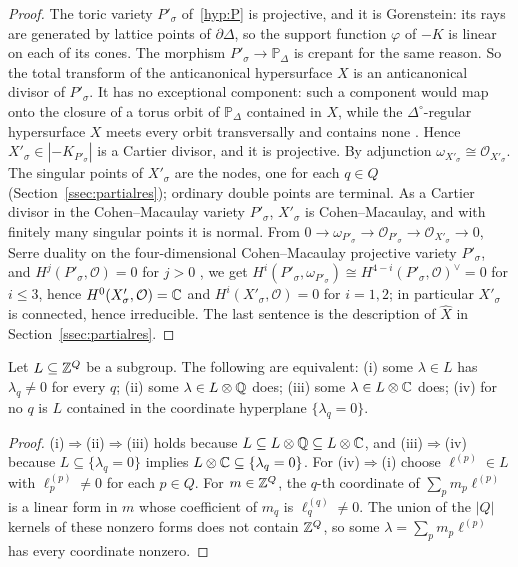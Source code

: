 \begin{proof}
The toric variety $P'_\sigma$ of~\ref{hyp:P} is projective, and it is Gorenstein: its rays are generated by lattice points
of $\partial\Delta$, so the support function $\varphi$ of $-K$ is linear on each of its cones. The morphism
$P'_\sigma\to\mathbb P_\Delta$ is crepant for the same reason. So the total transform of the anticanonical hypersurface $X$
is an anticanonical divisor of $P'_\sigma$. It has no exceptional component: such a component would map onto the closure
of a torus orbit of $\mathbb P_\Delta$ contained in $X$, while the $\Delta^\circ$-regular hypersurface $X$ meets every orbit
transversally and contains none \cite[\S3]{Batyrev}. Hence $X'_\sigma\in|-K_{P'_\sigma}|$ is a Cartier divisor, and it is
projective. By adjunction $\omega_{X'_\sigma}\cong\mathcal O_{X'_\sigma}$. The singular points of $X'_\sigma$ are the nodes,
one for each $q\in Q$ (Section~\ref{ssec:partialres}); ordinary double points are terminal. As a Cartier divisor in the
Cohen--Macaulay variety $P'_\sigma$, $X'_\sigma$ is Cohen--Macaulay, and with finitely many singular points it is normal.
From $0\to\omega_{P'_\sigma}\to\mathcal O_{P'_\sigma}\to\mathcal O_{X'_\sigma}\to0$, Serre duality on the four-dimensional
Cohen--Macaulay projective variety $P'_\sigma$, and $H^j(P'_\sigma,\mathcal O)=0$ for $j>0$ \cite[\S9.2]{CLS}, we get
$H^i(P'_\sigma,\omega_{P'_\sigma})\cong H^{4-i}(P'_\sigma,\mathcal O)^\vee=0$ for $i\le3$, hence
$H^0(X'_\sigma,\mathcal O)=\mathbb C$ and $H^i(X'_\sigma,\mathcal O)=0$ for $i=1,2$; in particular $X'_\sigma$ is connected, hence
irreducible. The last sentence is the description of $\widehat X$ in Section~\ref{ssec:partialres}.
\end{proof}

\begin{lemma}\label{lem:allnonzero}
Let $L\subseteq\mathbb Z^Q$ be a subgroup. The following are equivalent: (i) some $\lambda\in L$ has $\lambda_q\neq0$ for every
$q$; (ii) some $\lambda\in L\otimes\mathbb Q$ does; (iii) some $\lambda\in L\otimes\mathbb C$ does; (iv) for no $q$ is $L$ contained in the
coordinate hyperplane $\{\lambda_q=0\}$.
\end{lemma}

\begin{proof}
(i)$\Rightarrow$(ii)$\Rightarrow$(iii) holds because $L\subseteq L\otimes\mathbb Q\subseteq L\otimes\mathbb C$, and (iii)$\Rightarrow$(iv) because $L\subseteq\{\lambda_q=0\}$ implies
$L\otimes\mathbb C\subseteq\{\lambda_q=0\}$. For (iv)$\Rightarrow$(i) choose $\ell^{(p)}\in L$ with $\ell^{(p)}_p\neq0$ for each
$p\in Q$. For $m\in\mathbb Z^Q$, the $q$-th coordinate of $\sum_pm_p\ell^{(p)}$ is a linear form in $m$ whose coefficient of
$m_q$ is $\ell^{(q)}_q\neq0$. The union of the $|Q|$ kernels of these nonzero forms does not contain $\mathbb Z^Q$, so some
$\lambda=\sum_pm_p\ell^{(p)}$ has every coordinate nonzero.
\end{proof}

